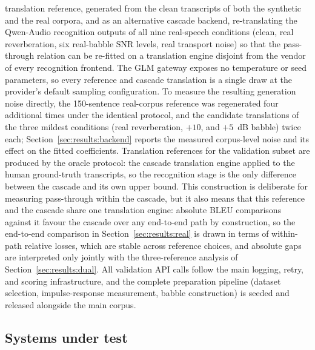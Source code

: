 translation
reference, generated from the clean transcripts of both the synthetic and
the real corpora, and as an alternative cascade backend, re-translating the
Qwen-Audio recognition outputs of all nine real-speech conditions
(clean, real reverberation, six real-babble SNR levels, real transport
noise) so that the pass-through relation
can be re-fitted on a translation engine disjoint from the vendor of every
recognition frontend. The GLM gateway exposes no temperature or seed
parameters, so every reference and cascade translation is a single draw at
the provider's default sampling configuration. To measure the resulting
generation noise directly, the 150-sentence real-corpus reference was
regenerated four additional times under the identical protocol, and the
candidate translations of the three mildest conditions (real reverberation,
$+10$, and $+5$~dB babble) twice each;
Section~\ref{sec:results:backend} reports the measured corpus-level noise
and its effect on the fitted coefficients. Translation references for the validation subset are
produced by the oracle protocol: the cascade translation engine applied to
the human ground-truth transcripts, so the recognition stage is the only
difference between the cascade and its own upper bound. This construction
is deliberate for measuring pass-through within the cascade, but it also
means that this reference and the cascade share one translation engine:
absolute BLEU comparisons against it favour the cascade over any
end-to-end path by construction, so the end-to-end comparison in
Section~\ref{sec:results:real} is drawn in terms of within-path relative
losses, which are stable across reference choices, and absolute gaps are
interpreted only jointly with the three-reference analysis of
Section~\ref{sec:results:dual}. All validation API calls follow the main
logging, retry, and scoring infrastructure, and the complete preparation
pipeline (dataset selection, impulse-response measurement, babble
construction) is seeded and released alongside the main corpus.

\subsection{Systems under test}

